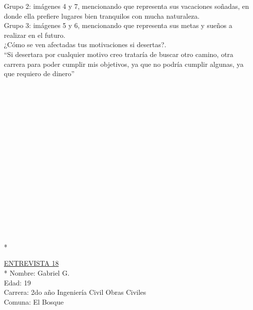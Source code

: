 Grupo 2: imágenes 4 y 7, mencionando que representa sus vacaciones soñadas, en donde ella prefiere lugares bien tranquilos con mucha naturaleza.\\

Grupo 3: imágenes 5 y 6, mencionando que representa sus metas y sueños a realizar en el futuro.\\

¿Cómo se ven afectadas tus motivaciones si desertas?.\\

``Si desertara por cualquier motivo creo trataría de buscar otro camino, otra carrera para poder cumplir mis objetivos, ya que no podría cumplir algunas, ya que requiero de dinero''\\
\\
\\
\\
\\
\\
\\
\\
\\
\\
\\
\\
\\
\\
\\
\\
\\
\\*


\underline {ENTREVISTA 18}\\*
Nombre: Gabriel G.\\
Edad: 19\\
Carrera: 2do año Ingeniería Civil Obras Civiles \\
Comuna: El Bosque\\

